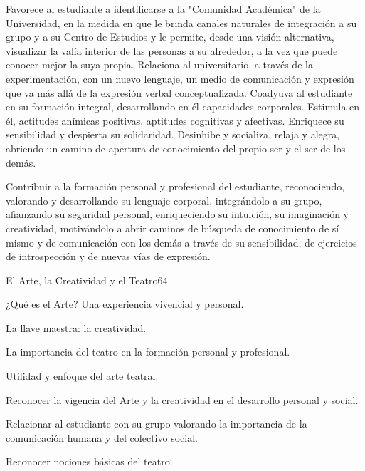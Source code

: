 \begin{syllabus}


\begin{justification}
Favorece al estudiante a identificarse a la "Comunidad Académica" de la Universidad, en la medida en que le brinda canales naturales de integración a su grupo y  a su Centro de Estudios y le permite,  desde una visión alternativa, visualizar la valía interior de las personas a su alrededor, a la vez que puede conocer mejor la suya propia. 
Relaciona al universitario, a través de la experimentación, con un nuevo lenguaje, un medio de comunicación y expresión que va más allá de la expresión verbal conceptualizada.
Coadyuva al estudiante en su formación integral, desarrollando en él  capacidades corporales. Estimula en él, actitudes anímicas positivas,  aptitudes cognitivas y afectivas. Enriquece su sensibilidad y despierta su solidaridad.    
Desinhibe y socializa, relaja y alegra,  abriendo un camino de apertura de conocimiento del propio ser y el ser de los demás.

\end{justification}

\begin{goals}
\item Contribuir a la formación personal y profesional del estudiante, reconociendo, valorando y desarrollando su lenguaje corporal, integrándolo a su grupo, afianzando su seguridad personal, enriqueciendo su intuición, su imaginación y creatividad, motivándolo  a abrir caminos de búsqueda  de conocimiento de sí mismo y de comunicación con los demás a través de su sensibilidad, de ejercicios de introspección y de nuevas vías de expresión.   
\end{goals}

\begin{outcomes}
\end{outcomes}

\begin{unit}{El Arte, la Creatividad y el Teatro}{}{6}{4}
\begin{topics}
	\item ¿Qué es el Arte? Una experiencia vivencial y personal.
	\item La llave maestra: la creatividad.
	\item La importancia del teatro en la formación personal y profesional.
	\item Utilidad y enfoque del arte teatral.
\end{topics}
\begin{learningoutcomes}
	\item Reconocer la vigencia del Arte y la creatividad en el desarrollo personal y social.
	\item Relacionar al estudiante con su grupo valorando la importancia de la comunicación humana y del colectivo  social.
	\item Reconocer nociones  básicas del teatro. 
\end{learningoutcomes}
\end{unit}


\end{syllabus}
